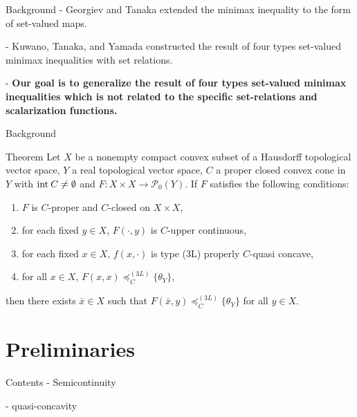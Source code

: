 \documentclass[aspectratio=169, dvipdfmx, 11pt]{beamer}
\newcommand{\Interior}[1]{\text{\rm int\:${#1}$}} %
\newcommand{\pow}[1]{\mathcal{P}_{0}(#1)}
\begin{document}
\begin{frame}{Background}
  - Georgiev and Tanaka \cite{MR1807037} extended the minimax inequality to the form of set-valued maps.

  - Kuwano, Tanaka, and Yamada \cite{MR2778674} constructed the result of four types set-valued minimax inequalities
  with set relations.

  - \textbf{Our goal is to generalize the result of four types set-valued minimax inequalities which is not related to the specific set-relations and scalarization functions.}
\end{frame}

\begin{frame}{Background}
  \begin{block}{Theorem \cite{MR2778674}}
    Let $X$ be a nonempty compact convex subset of a Hausdorff topological vector space,
    $Y$ a real topological vector space, $C$ a proper closed convex cone in $Y$ with $\Interior{C} \ne \emptyset$
    and $F\colon X \times X \to \pow{Y}$. If $F$ satisfies the following conditions:
    \begin{enumerate}
      \item $F$ is $C$-proper and $C$-closed on $X \times X$,
      \item for each fixed $y \in X$, $F(\cdot,y)$ is $C$-upper continuous,
      \item for each fixed $x \in X$, $f(x, \cdot)$ is type (3L) properly $C$-quasi concave,
      \item for all $x \in X$, $F(x,x) \preccurlyeq_{C}^{(3L)} \{\theta_{Y}\}$,
    \end{enumerate}
    then there exists $\bar{x} \in X$ such that $F(\bar{x},y) \preccurlyeq_{C}^{(3L)} \{\theta_{Y}\}$ for all $y \in X$.
  \end{block}
\end{frame}

\section{Preliminaries}

\begin{frame}{Contents}
  - Semicontinuity

  - quasi-concavity
\end{frame}
\end{document}
